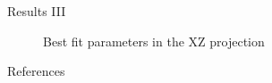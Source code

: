\documentclass[8pt]{beamer}
\begin{document}
\begin{frame}{Results III}

\vspace{-0.18cm}
\begin{figure}[h!]
    \centering
    \caption{Best fit parameters in the XZ projection}
    \label{fig:well}
\end{figure}



    
\end{frame}



\begin{frame}[allowframebreaks]{References}
 \cite{PS,G4}
  
  

\end{frame}
\end{document}
